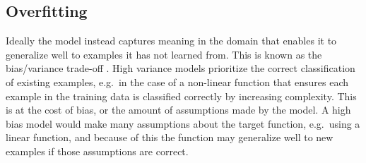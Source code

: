 

\subsection{Overfitting} %


  Ideally the model instead captures meaning in the domain that enables it to generalize well to examples it has not learned from.  This is known as the bias/variance trade-off \cite{Geman1992}. High variance models prioritize the correct classification of existing examples, e.g.\ in the case of a non-linear function that ensures each example in the training data is classified correctly by increasing complexity. This is at the cost of bias, or the amount of assumptions made by the model. A high bias model would make many assumptions about the target function, e.g.\ using a linear function, and because of this the function may generalize well to new examples if those assumptions are correct.





